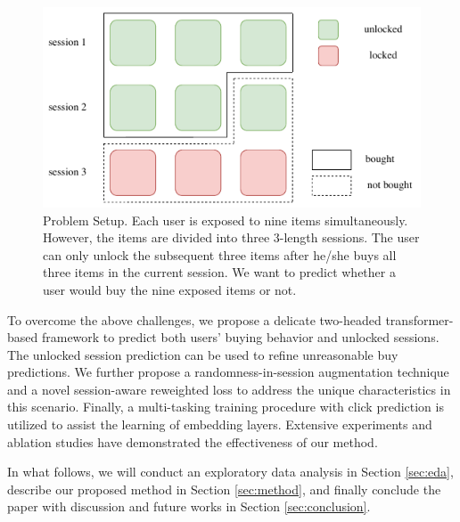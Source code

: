 
\begin{figure}[t!]
    \centering
    \includegraphics[width=\linewidth]{figures/problemdef.pdf}
    \caption{Problem Setup. Each user is exposed to nine items simultaneously. However, the items are divided into three 3-length sessions. The user can only unlock the subsequent three items after he/she buys all three items in the current session.
    We want to predict whether a user would buy the nine exposed items or not.}
    \label{fig:problemdef}
\end{figure}

To overcome the above challenges, we propose a delicate two-headed transformer-based framework to predict both users' buying behavior and unlocked sessions.
The unlocked session prediction can be used to refine unreasonable buy predictions.
We further propose a randomness-in-session augmentation technique and a novel session-aware reweighted loss to address the unique characteristics in this scenario.
Finally, a multi-tasking training procedure with click prediction is utilized to assist the learning of embedding layers.
Extensive experiments and ablation studies have demonstrated the effectiveness of our method.

In what follows, we will conduct an exploratory data analysis in Section \ref{sec:eda}, describe our proposed method in Section \ref{sec:method}, and finally conclude the paper with discussion and future works in Section \ref{sec:conclusion}.



